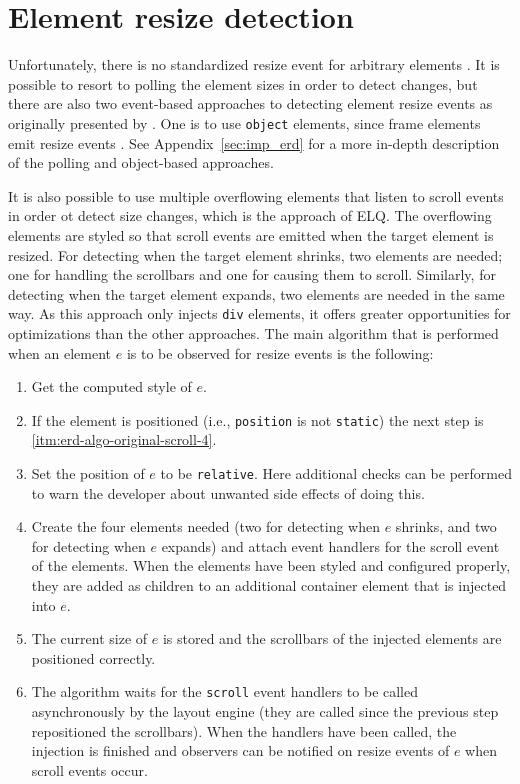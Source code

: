 \documentclass[]{llncs}
\newcommand{\code}[1]{\texttt{#1}}
\newcommand{\elq}{ELQ}
\begin{document}
\section{Element resize detection}\label{sec:imp}
  Unfortunately, there is no standardized resize event for arbitrary elements \cite{w3c_dom2_events}.
  It is possible to resort to polling the element sizes in order to detect changes, but there are also two event-based approaches to detecting element resize events as originally presented by \cite{backalley}.
  One is to use \code{object} elements, since frame elements emit resize events \cite{elq-thesis}.
  See Appendix~\ref{sec:imp_erd} for a more in-depth description of the polling and object-based approaches.

  It is also possible to use multiple overflowing elements that listen to scroll events in order ot detect size changes, which is the approach of \elq{}.
  The overflowing elements are styled so that scroll events are emitted when the target element is resized.
  For detecting when the target element shrinks, two elements are needed; one for handling the scrollbars and one for causing them to scroll.
  Similarly, for detecting when the target element expands, two elements are needed in the same way.
  As this approach only injects \code{div} elements, it offers greater opportunities for optimizations than the other approaches.
  The main algorithm that is performed when an element $e$ is to be observed for resize events is the following:
  \begin{enumerate}
    \item\label{itm:erd-algo-original-scroll-1} Get the computed style of $e$.
    \item\label{itm:erd-algo-original-scroll-2} If the element is positioned (i.e., \code{position} is not \code{static}) the next step is \ref{itm:erd-algo-original-scroll-4}.
    \item\label{itm:erd-algo-original-scroll-3} Set the position of $e$ to be \code{relative}. Here additional checks can be performed to warn the developer about unwanted side effects of doing this.
    \item\label{itm:erd-algo-original-scroll-4} Create the four elements needed (two for detecting when $e$ shrinks, and two for detecting when $e$ expands) and attach event handlers for the scroll event of the elements.
                                                When the elements have been styled and configured properly, they are added as children to an additional container element that is injected into $e$.
    \item\label{itm:erd-algo-original-scroll-5} The current size of $e$ is stored and the scrollbars of the injected elements are positioned correctly.
    \item\label{itm:erd-algo-original-scroll-6} The algorithm waits for the \code{scroll} event handlers to be called asynchronously by the layout engine (they are called since the previous step repositioned the scrollbars).
                                                When the handlers have been called, the injection is finished and observers can be notified on resize events of $e$ when scroll events occur.
  \end{enumerate}
\end{document}
